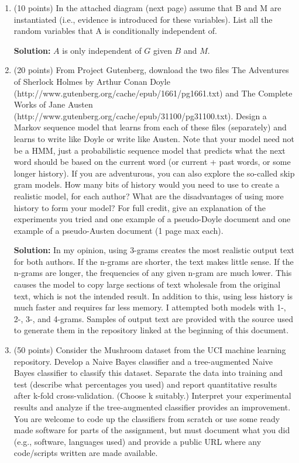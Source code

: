 \documentclass[11pt]{article}
\begin{document}
\begin{enumerate}
\item (10 points) In the attached diagram (next page) assume that B and M are instantiated (i.e., evidence is introduced for these variables). List all the random variables that A is conditionally independent of.

\textbf{Solution:} $A$ is only independent of $G$ given $B$ and $M$.

\item (20 points) From Project Gutenberg, download the two files The Adventures of Sherlock Holmes by Arthur Conan Doyle (http://www.gutenberg.org/cache/epub/1661/pg1661.txt) and The Complete Works of Jane Austen (http://www.gutenberg.org/cache/epub/31100/pg31100.txt). Design a Markov sequence model that learns from each of these files (separately) and learns to write like Doyle or write like Austen. Note that your model need not be a HMM, just a probabilistic sequence model that predicts what the next word should be based on the current word (or current + past words, or some longer history). If you are adventurous, you can also explore the so-called skip gram models. How many bits of history would you need to use to create a realistic model, for each author? What are the disadvantages of using more history to form your model? For full credit, give an explanation of the experiments you tried and one example of a pseudo-Doyle document and one example of a pseudo-Austen document (1 page max each).

\textbf{Solution:} In my opinion, using 3-grams creates the most realistic output text for both authors. If the n-grams are shorter, the text makes little sense. If the n-grams are longer, the frequencies of any given n-gram are much lower. This causes the model to copy large sections of text wholesale from the original text, which is not the intended result. In addition to this, using less history is much faster and requires far less memory. I attempted both models with 1-, 2-, 3-, and 4-grams. Samples of output text are provided with the source used to generate them in the repository linked at the beginning of this document.

\item (50 points) Consider the Mushroom dataset from the UCI machine learning repository. Develop a Naive Bayes classifier and a tree-augmented Naive Bayes classifier to classify this dataset. Separate the data into training and test (describe what percentages you used) and report quantitative results after k-fold cross-validation. (Choose k suitably.) Interpret your experimental results and analyze if the tree-augmented classifier provides an improvement. You are welcome to code up the classifiers from scratch or use some ready made software for parts of the assignment, but must document what you did (e.g., software, languages used) and provide a public URL where any code/scripts written are made available.


\end{enumerate}
\end{document}
